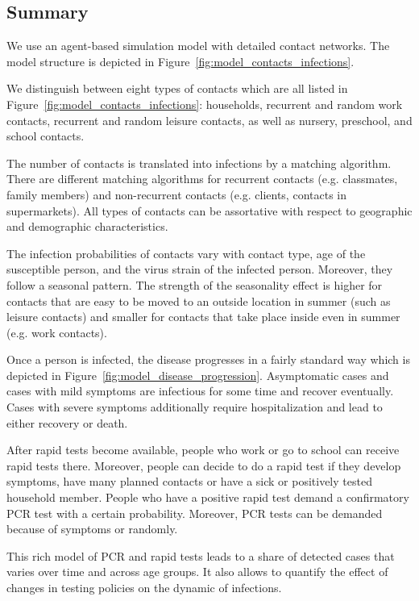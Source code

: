 \subsection{Summary}
\label{sub:model_summary}

We use an agent-based simulation model with detailed contact networks. The model
structure is depicted in Figure~\ref{fig:model_contacts_infections}.

We distinguish between eight types of contacts which are all listed in
Figure~\ref{fig:model_contacts_infections}: households, recurrent and random work
contacts, recurrent and random leisure contacts, as well as nursery, preschool, and
school contacts.

The number of contacts is translated into infections by a matching algorithm.
There are different matching algorithms for recurrent contacts (e.g. classmates, family
members) and non-recurrent contacts (e.g. clients, contacts in supermarkets).
All types of contacts can be assortative with respect to geographic and demographic
characteristics.

The infection probabilities of contacts vary with contact type, age of the susceptible
person, and the virus strain of the infected person. Moreover, they follow a seasonal
pattern. The strength of the seasonality effect is higher for contacts that are easy to
be moved to an outside location in summer (such as leisure contacts) and smaller for
contacts that take place inside even in summer (e.g. work contacts).

Once a person is infected, the disease progresses in a fairly standard way which is
depicted in Figure~\ref{fig:model_disease_progression}. Asymptomatic cases and cases with
mild symptoms are infectious for some time and recover eventually. Cases with severe
symptoms additionally require hospitalization and lead to either recovery or death.

After rapid tests become available, people who work or go to school can receive rapid
tests there. Moreover, people can decide to do a rapid test if they develop symptoms,
have many planned contacts or have a sick or positively tested household member. People
who have a positive rapid test demand a confirmatory PCR test with a certain probability.
Moreover, PCR tests can be demanded because of symptoms or randomly.

This rich model of PCR and rapid tests leads to a share of detected cases that varies
over time and across age groups. It also allows to quantify the effect of changes in
testing policies on the dynamic of infections.


